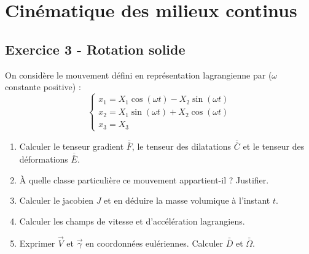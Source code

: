 \documentclass[12pt,a4paper]{article}
\begin{document}
\section{Cinématique des milieux continus}

\subsection*{Exercice 3 - Rotation solide \niveau{\moyen}}

\begin{boiteexercice}
On considère le mouvement défini en représentation lagrangienne par ($\omega$ constante positive) :
\[
\begin{cases}
x_1 = X_1\cos(\omega t) - X_2\sin(\omega t)\\
x_2 = X_1\sin(\omega t) + X_2\cos(\omega t)\\
x_3 = X_3
\end{cases}
\]
\begin{enumerate}
  \item Calculer le tenseur gradient $\overline{\overline{F}}$, le tenseur des dilatations $\overline{\overline{C}}$ et le tenseur des déformations $\overline{\overline{E}}$.
  \item À quelle classe particulière ce mouvement appartient-il ? Justifier.
  \item Calculer le jacobien $J$ et en déduire la masse volumique à l'instant $t$.
  \item Calculer les champs de vitesse et d'accélération lagrangiens.
  \item Exprimer $\vec{V}$ et $\vec{\gamma}$ en coordonnées eulériennes. Calculer $\overline{\overline{D}}$ et $\overline{\overline{\Omega}}$.
\end{enumerate}
\end{boiteexercice}
\end{document}
